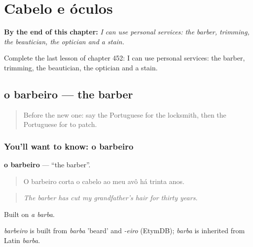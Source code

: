 
\chapter{Cabelo e óculos}
\label{ch:pt-cabelo-e-oculos}

\begin{chapteropening}
\textbf{By the end of this chapter:} \emph{I can use personal services: the barber, trimming, the beautician, the optician and a stain.}

Complete the last lesson of chapter 452: I can use personal services: the barber, trimming, the beautician, the optician and a stain.
\end{chapteropening}

\section[o barbeiro]{o barbeiro — the barber}

\label{lesson:PT-C452-barbeiro}



\begin{quote}
Before the new one: say the Portuguese for the locksmith, then the Portuguese for to patch.
\end{quote}

\subsection*{You'll want to know: o barbeiro}
\textbf{o barbeiro} — \textquotedblleft{}the barber\textquotedblright{}.

\begin{quote}
O barbeiro corta o cabelo ao meu avô há trinta anos.
\end{quote}

\begin{quote}
\emph{The barber has cut my grandfather's hair for thirty years.}
\end{quote}

Built on \emph{a barba}.

\begin{cousinweb}
\emph{barbeiro} is built from \emph{barba} 'beard' and \emph{-eiro} (EtymDB); \emph{barba} is inherited from Latin \emph{barba}.
\end{cousinweb}

